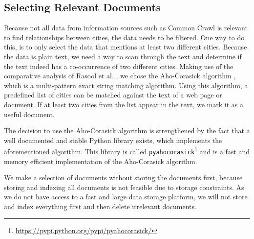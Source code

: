 \subsection{Selecting Relevant Documents}
Because not all data from information sources such as Common Crawl is relevant to find relationships between cities, the data needs to be filtered. One way to do this, is to only select the data that mentions at least two different cities. Because the data is plain text, we need a way to scan through the text and determine if the text indeed has a co-occurrence of two different cities.
Making use of the comparative analysis of Rasool et al. \cite{rasool2012string}, we chose the Aho-Corasick algorithm \cite{Aho-Corasick}, which is a multi-pattern exact string matching algorithm. Using this algorithm, a predefined list of cities can be matched against the text of a web page or document. If at least two cities from the list appear in the text, we mark it as a useful document.

The decision to use the Aho-Corasick algorithm is strengthened by the fact that a well documented and stable Python library exists, which implements the aforementioned algorithm. This library is called \texttt{pyahocorasick}\footnote{\url{https://pypi.python.org/pypi/pyahocorasick/}} and is a fast and memory efficient implementation of the Aho-Corasick algorithm.

We make a selection of documents without storing the documents first, because storing and indexing all documents is not feasible due to storage constraints. As we do not have access to a fast and large data storage platform, we will not store and index everything first and then delete irrelevant documents.
